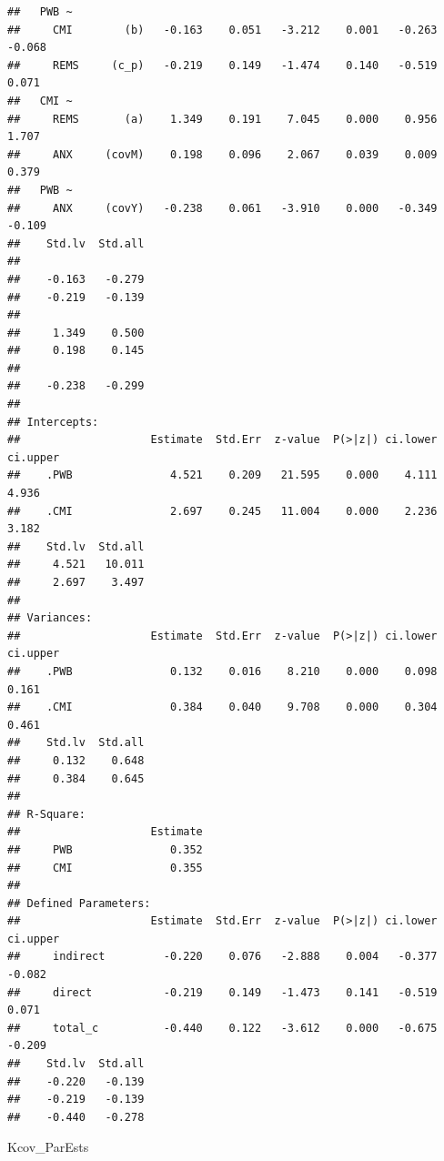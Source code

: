 \documentclass[
  11pt,
]{book}
\newenvironment{Shaded}{\begin{snugshade}}{\end{snugshade}}
\newcommand{\NormalTok}[1]{#1}
\begin{document}
\begin{verbatim}
##   PWB ~                                                                 
##     CMI        (b)   -0.163    0.051   -3.212    0.001   -0.263   -0.068
##     REMS     (c_p)   -0.219    0.149   -1.474    0.140   -0.519    0.071
##   CMI ~                                                                 
##     REMS       (a)    1.349    0.191    7.045    0.000    0.956    1.707
##     ANX     (covM)    0.198    0.096    2.067    0.039    0.009    0.379
##   PWB ~                                                                 
##     ANX     (covY)   -0.238    0.061   -3.910    0.000   -0.349   -0.109
##    Std.lv  Std.all
##                   
##    -0.163   -0.279
##    -0.219   -0.139
##                   
##     1.349    0.500
##     0.198    0.145
##                   
##    -0.238   -0.299
## 
## Intercepts:
##                    Estimate  Std.Err  z-value  P(>|z|) ci.lower ci.upper
##    .PWB               4.521    0.209   21.595    0.000    4.111    4.936
##    .CMI               2.697    0.245   11.004    0.000    2.236    3.182
##    Std.lv  Std.all
##     4.521   10.011
##     2.697    3.497
## 
## Variances:
##                    Estimate  Std.Err  z-value  P(>|z|) ci.lower ci.upper
##    .PWB               0.132    0.016    8.210    0.000    0.098    0.161
##    .CMI               0.384    0.040    9.708    0.000    0.304    0.461
##    Std.lv  Std.all
##     0.132    0.648
##     0.384    0.645
## 
## R-Square:
##                    Estimate
##     PWB               0.352
##     CMI               0.355
## 
## Defined Parameters:
##                    Estimate  Std.Err  z-value  P(>|z|) ci.lower ci.upper
##     indirect         -0.220    0.076   -2.888    0.004   -0.377   -0.082
##     direct           -0.219    0.149   -1.473    0.141   -0.519    0.071
##     total_c          -0.440    0.122   -3.612    0.000   -0.675   -0.209
##    Std.lv  Std.all
##    -0.220   -0.139
##    -0.219   -0.139
##    -0.440   -0.278
\end{verbatim}

\begin{Shaded}
\begin{Highlighting}[]
\NormalTok{Kcov\_ParEsts}
\end{Highlighting}
\end{Shaded}
\end{document}
